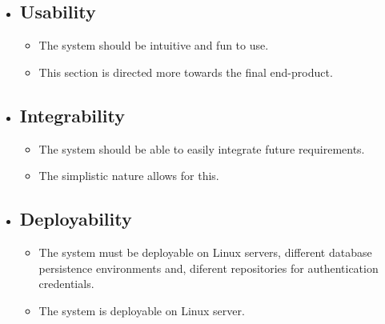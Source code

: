 \begin{itemize}
            \item \subsection{Usability}
                \begin{itemize}
                    \item The system should be intuitive and fun to use.
                    \item This section is directed more towards the final end-product.
                \end{itemize}
            
            \item \subsection{Integrability}
                \begin{itemize}
                    \item The system should be able to easily integrate future requirements.
                    \item The simplistic nature allows for this.
                \end{itemize}
                
            \item \subsection{Deployability}
                \begin{itemize}
                    \item The system must be deployable on Linux servers, different database persistence environments and, diferent repositories for authentication credentials.
                    \item The system is deployable on Linux server.
                \end{itemize}
        \end{itemize}
